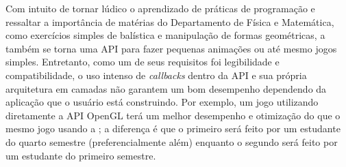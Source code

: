 
Com intuito de tornar lúdico  o aprendizado de práticas de programação
e  ressaltar a  importância de  matérias do  Departamento de  Física e
Matemática,  como exercícios  simples  de balística  e manipulação  de
formas geométricas,  a \playCB{}  também se torna  uma API  para fazer
pequenas animações ou até mesmo  jogos simples. Entretanto, como um de
seus requisitos  foi legibilidade e compatibilidade, o  uso intenso de
\emph{callbacks} dentro  da API e  sua própria arquitetura  em camadas
não garantem um  bom desempenho dependendo da aplicação  que o usuário
está construindo.   Por exemplo, um jogo utilizando  diretamente a API
OpenGL  terá um melhor  desempenho e  otimização do  que o  mesmo jogo
usando  a \playCB;  a diferença  é que  o primeiro  será feito  por um
estudante  do  quarto  semestre  (preferencialmente além)  enquanto  o
segundo será feito por um estudante do primeiro semestre.